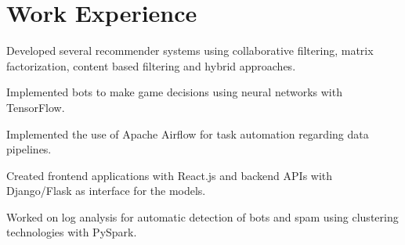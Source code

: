 \documentclass[]{deedy-resume-openfont}
\begin{document}







\section{Work Experience}

\begin{tightemize}
\item Developed several recommender systems using collaborative filtering, matrix
factorization, content based filtering and hybrid approaches.
\item Implemented bots to make game decisions using neural networks with 
TensorFlow.
\item Implemented the use of Apache Airflow for task automation regarding data pipelines.
\item Created frontend applications with React.js and
backend APIs with Django/Flask as interface for the models.
\item Worked on log analysis for automatic detection of bots and spam using
clustering technologies with PySpark.
\end{tightemize}
\sectionsep
\end{document}
